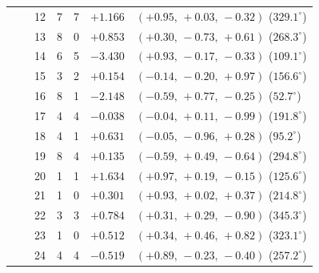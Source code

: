 \begin{table}
\begin{tabular}{@{}llrrrrl@{}}
 &  & 12 & 7 & 7 & $+1.166$ & $(+0.95,\,+0.03,\,-0.32)$ ($329.1^\circ$) \\
 &  & 13 & 8 & 0 & $+0.853$ & $(+0.30,\,-0.73,\,+0.61)$ ($268.3^\circ$) \\
 &  & 14 & 6 & 5 & $-3.430$ & $(+0.93,\,-0.17,\,-0.33)$ ($109.1^\circ$) \\
 &  & 15 & 3 & 2 & $+0.154$ & $(-0.14,\,-0.20,\,+0.97)$ ($156.6^\circ$) \\
 &  & 16 & 8 & 1 & $-2.148$ & $(-0.59,\,+0.77,\,-0.25)$ ($52.7^\circ$) \\
 &  & 17 & 4 & 4 & $-0.038$ & $(-0.04,\,+0.11,\,-0.99)$ ($191.8^\circ$) \\
 &  & 18 & 4 & 1 & $+0.631$ & $(-0.05,\,-0.96,\,+0.28)$ ($95.2^\circ$) \\
 &  & 19 & 8 & 4 & $+0.135$ & $(-0.59,\,+0.49,\,-0.64)$ ($294.8^\circ$) \\
 &  & 20 & 1 & 1 & $+1.634$ & $(+0.97,\,+0.19,\,-0.15)$ ($125.6^\circ$) \\
 &  & 21 & 1 & 0 & $+0.301$ & $(+0.93,\,+0.02,\,+0.37)$ ($214.8^\circ$) \\
 &  & 22 & 3 & 3 & $+0.784$ & $(+0.31,\,+0.29,\,-0.90)$ ($345.3^\circ$) \\
 &  & 23 & 1 & 0 & $+0.512$ & $(+0.34,\,+0.46,\,+0.82)$ ($323.1^\circ$) \\
 &  & 24 & 4 & 4 & $-0.519$ & $(+0.89,\,-0.23,\,-0.40)$ ($257.2^\circ$) \\
\bottomrule
\end{tabular}
\end{table}

